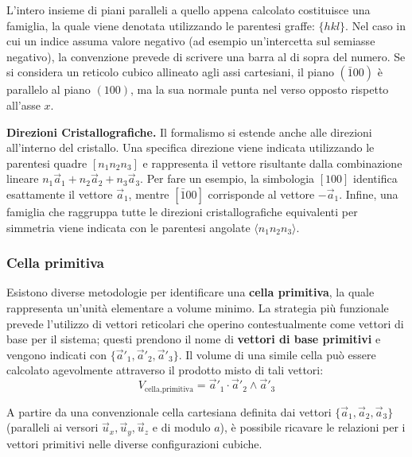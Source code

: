 L'intero insieme di piani paralleli a quello appena calcolato costituisce una famiglia, la quale viene denotata utilizzando le parentesi graffe: \( \{hkl\} \). Nel caso in cui un indice assuma valore negativo (ad esempio un'intercetta sul semiasse negativo), la convenzione prevede di scrivere una barra al di sopra del numero. Se si considera un reticolo cubico allineato agli assi cartesiani, il piano \( (\bar{1}00) \) è parallelo al piano \( (100) \), ma la sua normale punta nel verso opposto rispetto all'asse \( x \).

\textbf{Direzioni Cristallografiche.} Il formalismo si estende anche alle direzioni all'interno del cristallo. Una specifica direzione viene indicata utilizzando le parentesi quadre \( [n_1 n_2 n_3] \) e rappresenta il vettore risultante dalla combinazione lineare \( n_1\vec{a}_1 + n_2\vec{a}_2 + n_3\vec{a}_3 \). Per fare un esempio, la simbologia \( [100] \) identifica esattamente il vettore \( \vec{a}_1 \), mentre \( [\bar{1}00] \) corrisponde al vettore \( -\vec{a}_1 \). Infine, una famiglia che raggruppa tutte le direzioni cristallografiche equivalenti per simmetria viene indicata con le parentesi angolate \( \langle n_1 n_2 n_3 \rangle \).

\subsubsection{Cella primitiva}

Esistono diverse metodologie per identificare una \textbf{cella primitiva}, la quale rappresenta un'unità elementare a volume minimo. La strategia più funzionale prevede l'utilizzo di vettori reticolari che operino contestualmente come vettori di base per il sistema; questi prendono il nome di \textbf{vettori di base primitivi} e vengono indicati con \( \{\vec{a}'_1, \vec{a}'_2, \vec{a}'_3\} \). Il volume di una simile cella può essere calcolato agevolmente attraverso il prodotto misto di tali vettori:
\begin{equation*}
    V_{\text{cella,primitiva}} = \vec{a}'_1 \cdot \vec{a}'_2 \wedge \vec{a}'_3
\end{equation*}

A partire da una convenzionale cella cartesiana definita dai vettori \( \{\vec{a}_1, \vec{a}_2, \vec{a}_3\} \) (paralleli ai versori \( \vec{u}_x, \vec{u}_y, \vec{u}_z \) e di modulo \( a \)), è possibile ricavare le relazioni per i vettori primitivi nelle diverse configurazioni cubiche.

